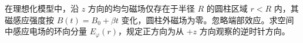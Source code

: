 在理想化模型中，沿 $z$ 方向的均匀磁场仅存在于半径 $R$ 的圆柱区域 $r<R$ 内，其磁感应强度按 $B(t)=B_0+\beta t$ 变化，圆柱外磁场为零。忽略端部效应。求空间中感应电场的环向分量 $E_\varphi(r)$，规定正方向为从 $+z$ 方向观察的逆时针方向。
